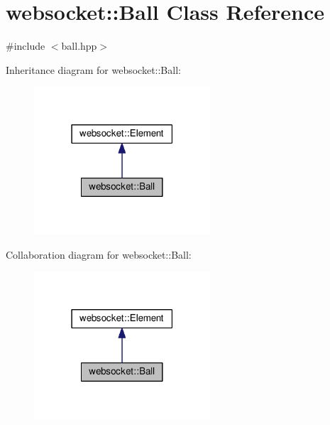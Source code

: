 \hypertarget{classwebsocket_1_1Ball}{}\section{websocket\+:\+:Ball Class Reference}
\label{classwebsocket_1_1Ball}


{\ttfamily \#include $<$ball.\+hpp$>$}



Inheritance diagram for websocket\+:\+:Ball\+:
\nopagebreak
\begin{figure}[H]
\begin{center}
\leavevmode
\includegraphics[width=186pt]{classwebsocket_1_1Ball__inherit__graph}
\end{center}
\end{figure}


Collaboration diagram for websocket\+:\+:Ball\+:
\nopagebreak
\begin{figure}[H]
\begin{center}
\leavevmode
\includegraphics[width=186pt]{classwebsocket_1_1Ball__coll__graph}
\end{center}
\end{figure}

